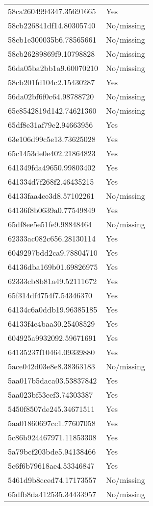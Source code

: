 \begin{tabular}{ll}
58ca2604994347.35691665 & Yes \\
58cb226841df14.80305740 & No/missing \\
58cb1e300035b6.78565661 & No/missing \\
58cb26289869f9.10798828 & No/missing \\
56da05ba2bb1a9.60070210 & No/missing \\
58cb201fd104c2.15430287 & Yes \\
56da02bf6f0c64.98788720 & No/missing \\
65e8542819d142.74621360 & No/missing \\
65df8e31af79e2.94663956 & Yes \\
63e106d99c5e13.73625028 & Yes \\
65c1453de0e402.21864823 & Yes \\
641349fda49650.99803402 & Yes \\
641334d7f268f2.46435215 & Yes \\
64133faa4ee3d8.57102261 & No/missing \\
64136f8b0639a0.77549849 & Yes \\
65df8ee5e51fe9.98848464 & No/missing \\
62333ac082c656.28130114 & Yes \\
6049297bdd2ca9.78804710 & Yes \\
64136dba169b01.69826975 & Yes \\
62333cb8b81a49.52111672 & Yes \\
65f314df4754f7.54346370 & Yes \\
64134c6a0ddb19.96385185 & Yes \\
64133f4e4baa30.25408529 & Yes \\
604925a9932092.59671691 & Yes \\
64135237f10464.09339880 & Yes \\
5ace042d03e8e8.38363183 & No/missing \\
5aa017b5daca03.53837842 & Yes \\
5aa023bf53eef3.74303387 & Yes \\
5450f8507de245.34671511 & Yes \\
5aa01860697cc1.77607058 & Yes \\
5c86b924467971.11853308 & Yes \\
5a79bcf203bde5.94138466 & Yes \\
5c6f6b79618ae4.53346847 & Yes \\
5461d9b8cced74.17173557 & No/missing \\
65dfb8da412535.34433957 & No/missing \\

\end{tabular}
